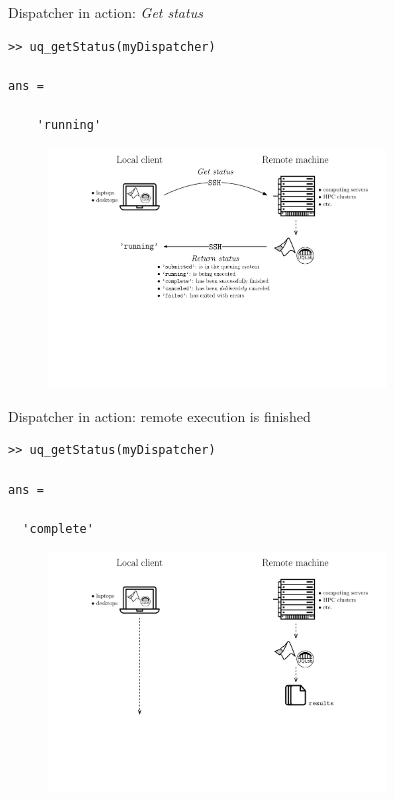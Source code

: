 \documentclass[]{rsuqbeamernew}
\begin{document}
\begin{frame}[fragile]{Dispatcher in action: \emph{Get status}}

\begin{lstlisting}[basicstyle=\scriptsize,numbers=none]
>> uq_getStatus(myDispatcher)
      
ans =

    'running'
\end{lstlisting}
      
\begin{figure}[htbp]    
  \centering
  \includegraphics[width= 0.8\textwidth]{./figures/dispatch-and-fetch-getStatus.pdf}
\end{figure}
    
\end{frame}

\begin{frame}[fragile]{Dispatcher in action: remote execution is finished}

\begin{lstlisting}[basicstyle=\scriptsize,numbers=none]
>> uq_getStatus(myDispatcher)
      
ans =
  
  'complete'
\end{lstlisting}
      
\begin{figure}[htbp]    
  \centering
  \includegraphics[width= 0.8\textwidth]{./figures/dispatch-and-fetch-completed.pdf}
\end{figure}
    
\end{frame}
\end{document}
